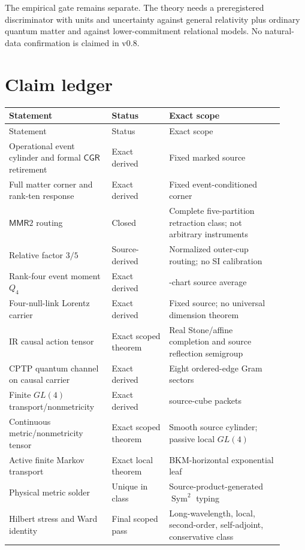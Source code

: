 \documentclass[11pt]{article}
\theoremstyle{definition}
\theoremstyle{remark}
\newcommand{\Sym}{\operatorname{Sym}}
\newcommand{\MMR}{\mathsf{MMR}}
\newcommand{\CGR}{\mathsf{CGR}}
\begin{document}
The empirical gate remains separate. The theory needs a preregistered discriminator with units and uncertainty against general relativity plus ordinary quantum matter and against lower-commitment relational models. No natural-data confirmation is claimed in v0.8.

\section{Claim ledger}

\begin{longtable}{>{\raggedright\arraybackslash}p{0.34\linewidth} >{\raggedright\arraybackslash}p{0.19\linewidth} >{\raggedright\arraybackslash}p{0.38\linewidth}}
\toprule
Statement & Status & Exact scope \\
\midrule
\endfirsthead
\toprule
Statement & Status & Exact scope \\
\midrule
\endhead
Operational event cylinder and formal $\CGR$ retirement & Exact derived & Fixed marked source \\
Full matter corner and rank-ten response & Exact derived & Fixed event-conditioned corner \\
$\MMR2$ routing & Closed & Complete five-partition retraction class; not arbitrary instruments \\
Relative factor $3/5$ & Source-derived & Normalized outer-cup routing; no SI calibration \\
Rank-four event moment $Q_4$ & Exact derived & 24-chart source average \\
Four-null-link Lorentz carrier & Exact derived & Fixed source; no universal dimension theorem \\
IR causal action tensor & Exact scoped theorem & Real Stone/affine completion and source reflection semigroup \\
CPTP quantum channel on causal carrier & Exact derived & Eight ordered-edge Gram sectors \\
Finite $GL(4)$ transport/nonmetricity & Exact derived & 48 source-cube packets \\
Continuous metric/nonmetricity tensor & Exact scoped theorem & Smooth source cylinder; passive local $GL(4)$ \\
Active finite Markov transport & Exact local theorem & BKM-horizontal exponential leaf \\
Physical metric solder & Unique in class & Source-product-generated $\Sym^2$ typing \\
Hilbert stress and Ward identity & Final scoped pass & Long-wavelength, local, second-order, self-adjoint, conservative class \\

\end{longtable}
\end{document}
